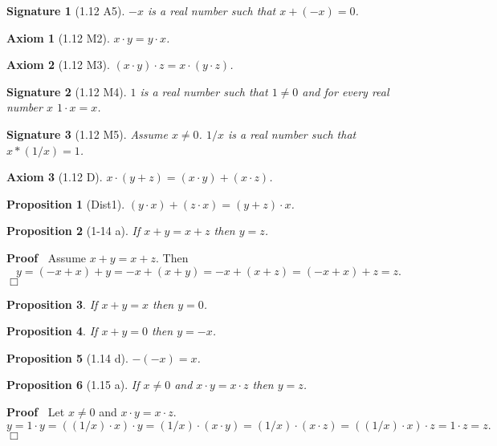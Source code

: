 \documentclass{article}
\newenvironment{forthel}{\begin{leftbar}}{\end{leftbar}}
\newenvironment{proof}{\noindent\textbf{Proof\ }}{\hspace*{\fill}$\Box$\medskip}
\newtheorem{axiom}{Axiom}
\newtheorem{signature}{Signature}
\newtheorem{proposition}{Proposition}
\begin{document}
\begin{forthel}
\begin{signature}[1.12 A5] $-x$ is a real number such that $x + (-x) = 0$.
\end{signature}

\begin{axiom}[1.12 M2] $x \cdot y = y \cdot x$.\end{axiom}

\begin{axiom}[1.12 M3] $(x \cdot y) \cdot z = x \cdot (y \cdot z)$.
\end{axiom}

\begin{signature}[1.12 M4] $1$ is a real number such that $1 \neq 0$ and 
for every real number $x$ $1 \cdot x = x$.\end{signature}

\begin{signature}[1.12 M5] Assume $x \neq 0$. $1/x$ is a real number
such that $x * (1/x) = 1$.\end{signature}

\begin{axiom}[1.12 D] $x \cdot (y + z) = (x \cdot y) + (x \cdot z)$.
\end{axiom}
\begin{proposition}[Dist1] $(y \cdot x) + (z \cdot x) = (y + z) \cdot x$.
\end{proposition}

\begin{proposition}[1-14 a] If $x + y = x + z$ then $y = z$.
\end{proposition}
\begin{proof} Assume $x + y = x + z$. Then 
$$y = (-x+x) + y = -x + (x+y) = -x + (x+z) = (-x+x) + z = z.$$
\end{proof}

\begin{proposition} If $x + y = x$ then $y = 0$.\end{proposition}
\begin{proposition} If $x + y = 0$ then $y = -x$.\end{proposition}
\begin{proposition}[1.14 d] $-(-x) = x$.\end{proposition}


\begin{proposition}[1.15 a] If $x \neq 0$ and $x \cdot y = x \cdot z$ 
then $y = z$. \end{proposition}
\begin{proof} Let $x \neq 0$ and $x \cdot y = x \cdot z$.
$$y = 1 \cdot y = ((1/x) \cdot x) \cdot y = (1/x) \cdot (x \cdot y) =
(1/x) \cdot (x \cdot z) = ((1/x) \cdot x) \cdot z = 1 \cdot z = z.$$
\end{proof}


\end{forthel}
\end{document}
